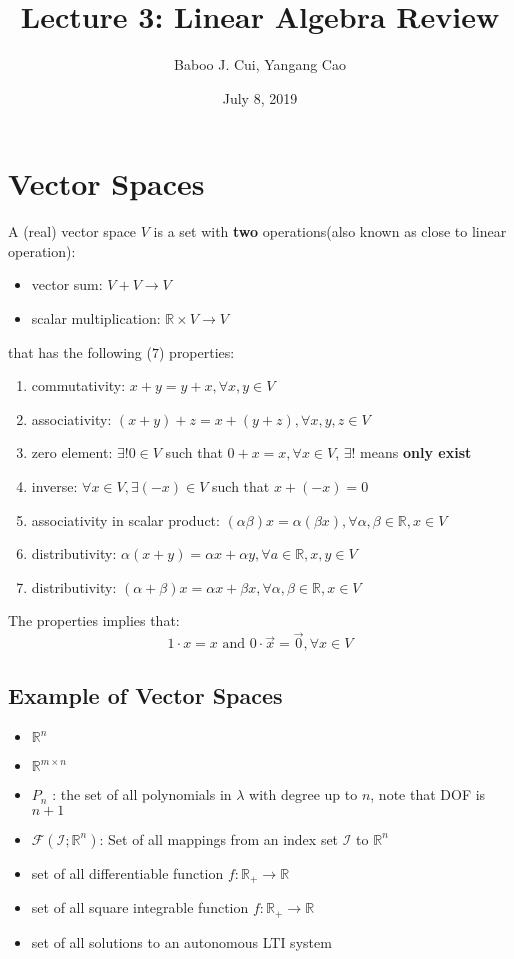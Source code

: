 \documentclass[10pt,a4paper,oneside]{article}
\date{July 8, 2019}
\author{Baboo J. Cui, Yangang Cao}
\title{Lecture 3: Linear Algebra Review}
\begin{document}
\maketitle
\tableofcontents
\newpage

\section{Vector Spaces}
A (real) vector space $V$ is a set with \textbf{two} operations(also known as close to linear operation):
\begin{itemize}
\item vector sum: $V +V\rightarrow V$
\item scalar multiplication: $\mathbb{R}\times V\rightarrow V$
\end{itemize}
that has the following ($7$) properties:
\begin{enumerate}
\item commutativity: $x+y=y+x, \forall x, y \in V$
\item associativity: $(x+y)+z=x+(y+z), \forall x, y, z \in V$
\item zero element: $\exists !0 \in V$ such that $0+x=x, \forall x \in V$, $\exists!$ means \textbf{only exist}
\item inverse: $\forall x \in V, \exists(-x) \in V$ such that $x+(-x)=0$
\item associativity in scalar product: $(\alpha \beta) x=\alpha(\beta x), \forall \alpha, \beta \in \mathbb{R}, x \in V$
\item distributivity: $\alpha(x+y)=\alpha x+\alpha y, \forall a \in \mathbb{R}, x, y \in V$
\item distributivity: $(\alpha+\beta) x=\alpha x+\beta x, \forall \alpha, \beta \in \mathbb{R}, x \in V$
\end{enumerate}
The properties implies that:
\[
1 \cdot x=x \text{ and } 0 \cdot \vec{x}=\vec{0}, \forall x \in V
\]

\subsection{Example of Vector Spaces}
\begin{itemize}
\item $\mathbb{R}^n$
\item $\mathbb{R}^{m \times n}$
\item $P_{n}$ : the set of all polynomials in $\lambda$ with degree up to $n$, note that DOF is $n+1$
\item $\mathcal{F}\left(\mathcal{I} ; \mathbb{R}^{n}\right)$: Set of all mappings from an index set $\mathcal{I}$ to $\mathbb{R}^{n}$
\item set of all differentiable function $f : \mathbb{R}_{+} \rightarrow \mathbb{R}$
\item set of all square integrable function $f : \mathbb{R}_{+} \rightarrow \mathbb{R}$
\item set of all solutions to an autonomous LTI system
\end{itemize}
\end{document}
